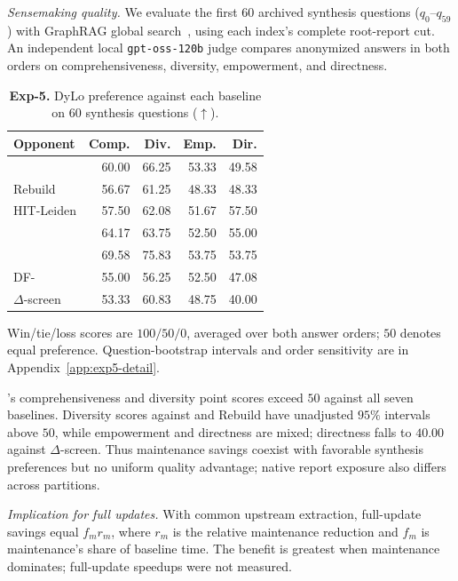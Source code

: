 \emph{Sensemaking quality.} We evaluate the first $60$ archived synthesis
questions ($q_0$--$q_{59}$)
with GraphRAG global search~\cite{edge2024graphrag}, using each index's
complete root-report cut. An independent local \texttt{gpt-oss-120b} judge
compares anonymized answers in both orders on comprehensiveness, diversity,
empowerment, and directness.

\begin{table}[tb]\centering
\caption{\textbf{Exp-5.} DyLo preference against each baseline on $60$ synthesis questions ($\uparrow$).}
\label{tab:sensemaking-current}
\footnotesize
\setlength{\tabcolsep}{0.25em}
\begin{tabular*}{\linewidth}{@{\extracolsep{\fill}}lrrrr@{}}
\toprule
Opponent & Comp. & Div. & Emp. & Dir. \\
\midrule
\Batch{} & 60.00 & 66.25 & 53.33 & 49.58 \\
Rebuild & 56.67 & 61.25 & 48.33 & 48.33 \\
HIT-Leiden & 57.50 & 62.08 & 51.67 & 57.50 \\
\DynaMo{} & 64.17 & 63.75 & 52.50 & 55.00 \\
\QCA{} & 69.58 & 75.83 & 53.75 & 53.75 \\
DF-\Louvain{} & 55.00 & 56.25 & 52.50 & 47.08 \\
$\Delta$-screen & 53.33 & 60.83 & 48.75 & 40.00 \\
\bottomrule
\end{tabular*}
\par\smallskip\raggedright
Win/tie/loss scores are $100/50/0$, averaged over both answer orders;
$50$ denotes equal preference. Question-bootstrap intervals and order
sensitivity are in Appendix~\ref{app:exp5-detail}.
\end{table}

\DyLo{}'s comprehensiveness and diversity point scores exceed $50$ against
all seven baselines. Diversity scores against \Batch{} and Rebuild have
unadjusted $95\%$ intervals above $50$, while empowerment and directness
are mixed; directness falls to $40.00$ against $\Delta$-screen.
Thus maintenance savings coexist with favorable synthesis preferences
but no uniform quality advantage; native report exposure also differs
across partitions.

\emph{Implication for full updates.} With common upstream extraction,
full-update savings equal $f_m r_m$, where $r_m$ is the relative maintenance
reduction and $f_m$ is maintenance's share of baseline time. The benefit
is greatest when maintenance dominates; full-update speedups were not measured.
